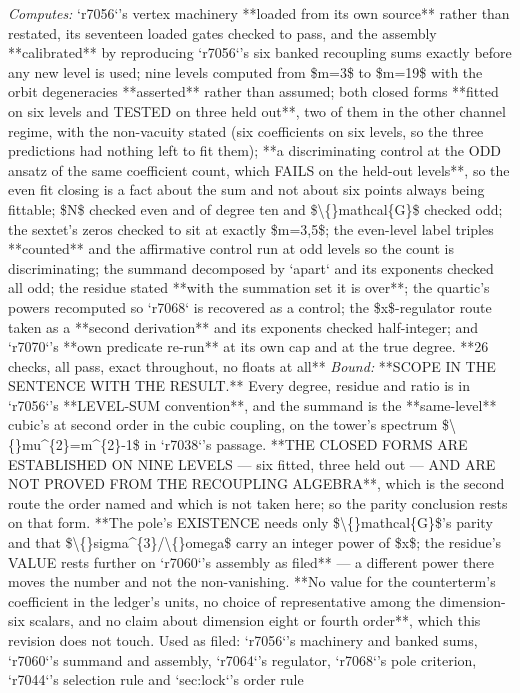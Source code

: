 \begin{description}
\emph{Computes:} `r7056`'s vertex machinery **loaded from its own source** rather than restated, its seventeen loaded gates checked to pass, and the assembly **calibrated** by reproducing `r7056`'s six banked recoupling sums exactly before any new level is used; nine levels computed from \$m=3\$ to \$m=19\$ with the orbit degeneracies **asserted** rather than assumed; both closed forms **fitted on six levels and TESTED on three held out**, two of them in the other channel regime, with the non-vacuity stated (six coefficients on six levels, so the three predictions had nothing left to fit them); **a discriminating control at the ODD ansatz of the same coefficient count, which FAILS on the held-out levels**, so the even fit closing is a fact about the sum and not about six points always being fittable; \$N\$ checked even and of degree ten and \$\textbackslash\{\}mathcal\{G\}\$ checked odd; the sextet's zeros checked to sit at exactly \$m=3,5\$; the even-level label triples **counted** and the affirmative control run at odd levels so the count is discriminating; the summand decomposed by `apart` and its exponents checked all odd; the residue stated **with the summation set it is over**; the quartic's powers recomputed so `r7068` is recovered as a control; the \$x\$-regulator route taken as a **second derivation** and its exponents checked half-integer; and `r7070`'s **own predicate re-run** at its own cap and at the true degree. **26 checks, all pass, exact throughout, no floats at all**
 \emph{Bound:}  **SCOPE IN THE SENTENCE WITH THE RESULT.** Every degree, residue and ratio is in `r7056`'s **LEVEL-SUM convention**, and the summand is the **same-level** cubic's at second order in the cubic coupling, on the tower's spectrum \$\textbackslash\{\}mu\textasciicircum{}\{2\}=m\textasciicircum{}\{2\}-1\$ in `r7038`'s passage.  **THE CLOSED FORMS ARE ESTABLISHED ON NINE LEVELS --- six fitted, three held out --- AND ARE NOT PROVED FROM THE RECOUPLING ALGEBRA**, which is the second route the order named and which is not taken here; so the parity conclusion rests on that form.  **The pole's EXISTENCE needs only \$\textbackslash\{\}mathcal\{G\}\$'s parity and that \$\textbackslash\{\}sigma\textasciicircum{}\{3\}/\textbackslash\{\}omega\$ carry an integer power of \$x\$; the residue's VALUE rests further on `r7060`'s assembly as filed** --- a different power there moves the number and not the non-vanishing. **No value for the counterterm's coefficient in the ledger's units, no choice of representative among the dimension-six scalars, and no claim about dimension eight or fourth order**, which this revision does not touch. Used as filed: `r7056`'s machinery and banked sums, `r7060`'s summand and assembly, `r7064`'s regulator, `r7068`'s pole criterion, `r7044`'s selection rule and `sec:lock`'s order rule

\end{description}
